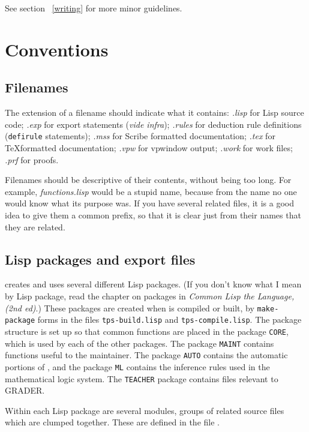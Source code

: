 See section ~\ref{writing} for more minor guidelines.

\section{\TPS Conventions}

\subsection{Filenames}

The extension of a filename should indicate what it contains:
{\it .lisp} for Lisp source code; {\it .exp} for export statements
({\it vide infra}); {\it .rules} for deduction rule definitions
({\tt defirule} statements); {\it .mss} for Scribe formatted
documentation; {\it .tex} for \TeX formatted documentation;
{\it .vpw} for vpwindow output; {\it .work} for work files; {\it .prf} for proofs.

Filenames should be descriptive of their contents, without being too long.  For example,
{\it functions.lisp} would be a stupid name, because from the name no
one would know what its purpose was.  If you have several related
files, it is a good idea to give them a common prefix, so that it is
clear just from their names that they are related. 

\subsection{Lisp packages and export files}

\TPS creates and uses several different Lisp packages.  (If you don't
know what I mean by Lisp package, read the chapter on packages in {\it 
Common Lisp the Language, (2nd ed)}.)  These packages are
created when \TPS is compiled or built, by {\tt make-package} forms in
the files {\tt tps-build.lisp} and {\tt tps-compile.lisp}.  The package
structure is set up so that common functions are placed in the package
{\tt CORE}, which is used by each of the other packages.  
The package {\tt MAINT} contains functions useful to the maintainer. 
The package {\tt AUTO} contains the automatic portions of \TPS, and the
package {\tt ML} contains the inference rules used in the mathematical
logic system.  The {\tt TEACHER} package contains files relevant to GRADER.

Within each Lisp package are several \TPS modules, 
groups of related source files which are clumped together.
These are defined in the file {\it {}}.

